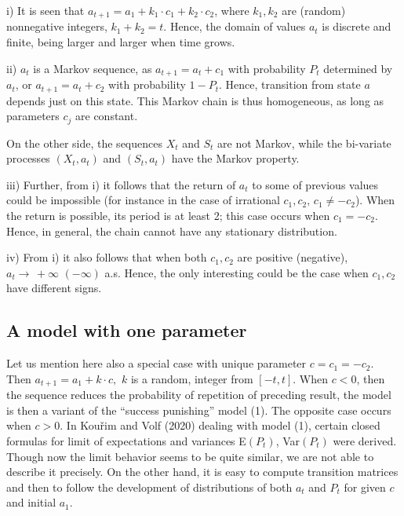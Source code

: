 \documentclass[11pt]{article}
\begin{document}
 \begin{description}
\item i) It is seen that $a_{t+1}=a_1+k_1\cdot c_1 + k_2\cdot
c_2$, where $k_1, k_2$ are (random) nonnegative integers,
$k_1+k_2=t$. Hence, the domain of values $a_t$ is discrete and
finite, being larger and larger when time grows.

\item ii) $a_t$ is a Markov sequence, as $a_{t+1}=a_t+c_1$ with
probability $P_t$ determined by $a_t$, or $a_{t+1}=a_t+c_2$ with
probability $1-P_t$. Hence, transition from state $a$ depends
just on this state. This Markov chain is thus homogeneous, as long
as parameters $c_j$ are constant.

On the other side, the sequences $X_t$ and $S_t$ are not Markov, while the
bi-variate processes $(X_t, a_t)$ and $(S_t, a_t)$ have the Markov property.

\item iii) Further, from i) it follows that the return of $a_t$ to
some of previous values could be impossible (for instance in the
case of irrational $c_1, c_2,\, c_1\ne -c_2$). When the return is
possible, its period is at least 2; this case occurs when
$c_1=-c_2$. Hence, in general, the chain cannot have any
stationary distribution.

\item iv) From i) it also follows that when both $c_1, c_2$ are
positive (negative), $a_t \to \, +\infty\,\,(-\infty)$ a.s.
Hence, the only interesting could be the case when $c_1, c_2$ have
different signs.
 \end{description}

\subsection{A model with one parameter}

Let us mention here also a special case with unique parameter
$c=c_1=-c_2$. Then $a_{t+1}=a_1+k\cdot c,$ $k$ is a random, integer from
$[-t, t]$. When $c<0$, then the sequence reduces the probability
of repetition of preceding result, the model is then a variant of the
``success punishing'' model (1). The opposite case occurs when
$c>0$. In Kou\v{r}im and Volf (2020) dealing with model (1),
certain closed formulas for limit of expectations and variances
E$(P_t)$, Var$(P_t)$ were derived. Though now the limit behavior
seems to be quite similar, we are not able to describe it
precisely. On the other hand, it is easy to compute transition matrices
and then to follow the development of distributions of both $a_t$ and $P_t$
 for given $c$ and initial $a_1$.
\end{document}
